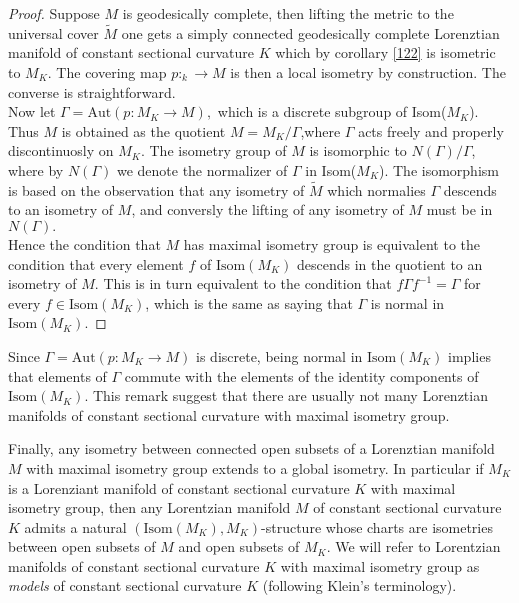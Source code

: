 \begin{proof}
    Suppose $M$ is geodesically complete, then lifting the metric to the universal cover $\tilde{M}$ one gets a simply connected geodesically complete Lorenztian manifold of constant sectional curvature $K$ which by corollary \ref{122} is isometric to $M_K$. The covering map $p:_k\to M$ is then a local isometry by construction. The converse is straightforward. \\   
    Now let $\Gamma=\text{Aut}(p:M_K\to M),$ which is a discrete subgroup of Isom($M_K$). Thus $M$ is obtained as the quotient $M=M_{K}/\Gamma$,where $\Gamma$ acts freely and properly discontinuosly on $M_K$. The isometry group of $M$ is isomorphic to $N(\Gamma)/\Gamma$, where by $N(\Gamma)$ we denote the normalizer of $\Gamma$ in Isom($M_K$). The isomorphism is based on the observation that any isometry of $\tilde{M}$ which normalies $\Gamma$ descends to an isometry of $M$, and conversly the lifting of any isometry of $M$ must be in $N(\Gamma).$\\
    Hence the condition that $M$ has maximal isometry group is equivalent to the condition that every element $f$ of $\text{Isom}(M_K)$ descends in the quotient to an isometry of $M$. This is in turn equivalent to the condition that $f\Gamma f^{-1}=\Gamma$ for every $f\in \text{Isom}(M_K)$, which is the same as saying that $\Gamma$ is normal in $\text{Isom}(M_K)$.
\end{proof}

\begin{observation}
Since $\Gamma=\text{Aut}(p:M_K\to M)$ is discrete, being normal in $\text{Isom}(M_K)$ implies that elements of $\Gamma$ commute with the elements of the identity components of $\text{Isom}(M_K)$. This remark suggest that there are usually not many Lorenztian manifolds of constant sectional curvature with maximal isometry group.
\end{observation}

Finally, any isometry between connected open subsets of a Lorenztian manifold $M$ with maximal isometry group extends to a global isometry. In particular if $M_K$ is a Lorenziant manifold of constant sectional curvature $K$ with maximal isometry group, then any Lorentzian manifold $M$ of constant sectional curvature $K$ admits a natural $(\text{Isom}(M_K), M_K)$-structure whose charts are isometries between open subsets of $M$ and open subsets of $M_K$. We will refer to Lorentzian manifolds of constant sectional curvature $K$ with maximal isometry group as \textit{models} of constant sectional curvature $K$ (following Klein's terminology). 